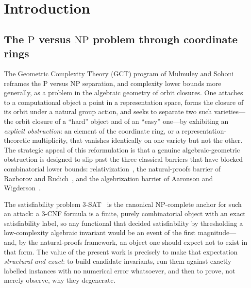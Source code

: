 \documentclass[pdflatex,sn-mathphys-num]{sn-jnl}
\theoremstyle{thmstyleone}%
\theoremstyle{thmstyletwo}%
\theoremstyle{thmstylethree}%
\begin{document}
\maketitle
\section{Introduction}\label{sec:intro}

\subsection{The \texorpdfstring{$\mathrm{P}$ versus $\mathrm{NP}$}{P vs NP} problem through
coordinate rings}

The Geometric Complexity Theory (GCT) program of Mulmuley and
Sohoni~\cite{GCT1,GCT2,MulmuleyCACM} reframes the $\mathrm{P}$ versus
$\mathrm{NP}$ separation, and complexity lower bounds more generally, as a
problem in the algebraic geometry of orbit closures. One attaches to a
computational object a point in a representation space, forms the closure
of its orbit under a natural group action, and seeks to separate two such
varieties---the orbit closure of a ``hard'' object and of an ``easy''
one---by exhibiting an \emph{explicit obstruction}: an element of the
coordinate ring, or a representation-theoretic multiplicity, that vanishes
identically on one variety but not the other. The strategic appeal of this
reformulation is that a genuine algebraic-geometric obstruction is designed
to slip past the three classical barriers that have blocked combinatorial
lower bounds: relativization~\cite{BGS}, the natural-proofs barrier of
Razborov and Rudich~\cite{RR}, and the algebrization barrier of Aaronson
and Wigderson~\cite{AW}.

The satisfiability problem $3$-SAT~\cite{Cook} is the canonical
$\mathrm{NP}$-complete anchor for such an attack: a $3$-CNF formula is a
finite, purely combinatorial object with an exact satisfiability label, so
any functional that decided satisfiability by thresholding a low-complexity
algebraic invariant would be an event of the first magnitude---and, by the
natural-proofs framework, an object one should expect not to exist in that
form. The value of the present work is precisely to make that expectation
\emph{structural and exact}: to build candidate invariants, run them
against exactly labelled instances with no numerical error whatsoever, and
then to prove, not merely observe, why they degenerate.
\end{document}
